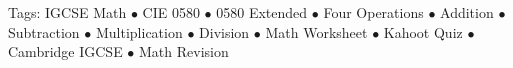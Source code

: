 \documentclass[11pt,a4paper]{article}
\begin{document}
\vspace{14pt}
\begin{center}
  \sffamily\scriptsize\textcolor{textmuted}{
    Tags: IGCSE Math $\bullet$ CIE 0580 $\bullet$ 0580 Extended $\bullet$ Four Operations $\bullet$ Addition $\bullet$ Subtraction $\bullet$ Multiplication $\bullet$ Division $\bullet$ Math Worksheet $\bullet$ Kahoot Quiz $\bullet$ Cambridge IGCSE $\bullet$ Math Revision
  }
\end{center}
\end{document}
